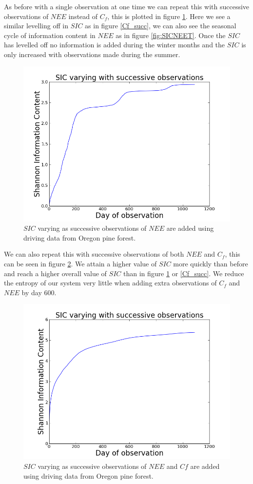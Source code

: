 \documentclass[11pt]{article}
\begin{document}
As before with a single observation at one time we can repeat this with successive observations of $NEE$ instead of $C_f$, this is plotted in figure \ref{SIC_succ}. Here we see a similar levelling off in $SIC$ as in figure \ref{Cf_succ}, we can also see the seasonal cycle of information content in $NEE$ as in figure \ref{fig:SICNEET}. Once the $SIC$ has levelled off no information is added during the winter months and the $SIC$ is only increased with observations made during the summer.

\begin{figure}[H]
\centering
\includegraphics[height=.34\textwidth]{SIC0_1090nee.png}
\caption{$SIC$ varying as successive observations of $NEE$ are added using driving data from Oregon pine forest.}
\label{SIC_succ}
\end{figure} 

We can also repeat this with successive observations of both $NEE$ and $C_f$, this can be seen in figure \ref{fig:SIC_neecfsubplot}. We attain a higher value of $SIC$ more quickly than before and reach a higher overall value of $SIC$ than in figure \ref{SIC_succ} or \ref{Cf_succ}. We reduce the entropy of our system very little when adding extra observations of $C_f$ and $NEE$ by day 600.

\begin{figure}[H]
\centering
\includegraphics[height=.34\textwidth]{SIC0_1090cfnee.png}
\caption{$SIC$ varying as successive observations of $NEE$ and $Cf$ are added using driving data from Oregon pine forest.}
\label{fig:SIC_neecfsubplot}
\end{figure}
\end{document}
